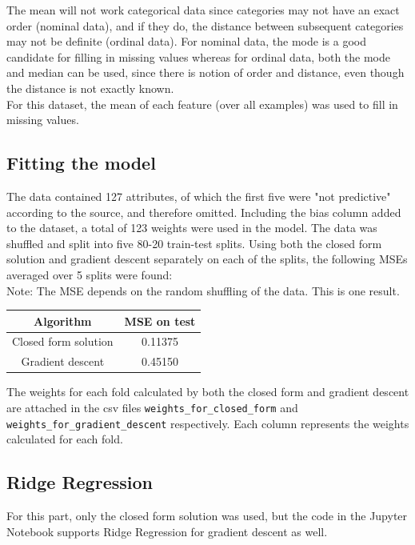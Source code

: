 \documentclass[paper=a4, fontsize=11pt]{scrartcl} %
\numberwithin{equation}{section} %
\numberwithin{figure}{section} %
\numberwithin{table}{section} %
\begin{document}
The mean will not work categorical data since categories may not have an exact order (nominal data), and if they do, the distance between subsequent categories may not be definite (ordinal data). For nominal data, the mode is a good candidate for filling in missing values whereas for ordinal data, both the mode and median can be used, since there is notion of order and distance, even though the distance is not exactly known. \\

For this dataset, the mean of each feature (over all examples) was used to fill in missing values. 

\subsection{Fitting the model}
The data contained 127 attributes, of which the first five were "not predictive" according to the source, and therefore omitted. Including the bias column added to the dataset, a total of 123 weights were used in the model. The data was shuffled and split into five 80-20 train-test splits. Using both the closed form solution and gradient descent separately on each of the splits, the following MSEs averaged over 5 splits were found:\\

Note: The MSE depends on the random shuffling of the data. This is one result.
\begin{center}
\begin{tabular}{ |c|c| } 
    \hline
    \textbf{Algorithm} & \textbf{MSE on test} \\
    \hline
    Closed form solution & 0.11375 \\
    Gradient descent & 0.45150 \\ 
    \hline
\end{tabular}
\end{center}

The weights for each fold calculated by both the closed form and gradient descent are attached in the csv files \texttt{weights\_for\_closed\_form} and \texttt{weights\_for\_gradient\_descent} respectively. Each column represents the weights calculated for each fold.

\subsection{Ridge Regression}
For this part, only the closed form solution was used, but the code in the Jupyter Notebook supports Ridge Regression for gradient descent as well. \\
\end{document}
